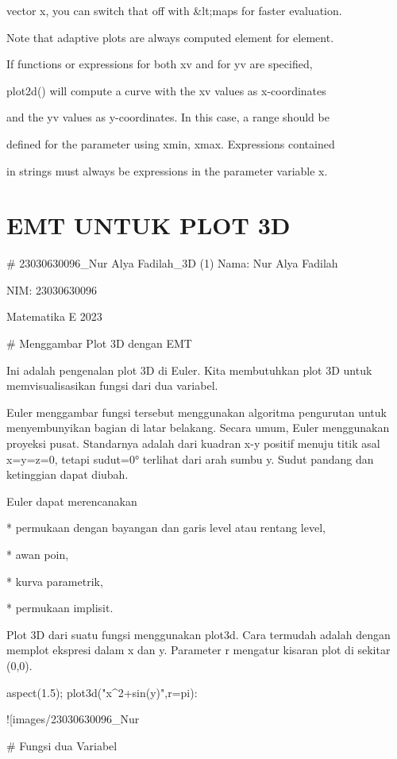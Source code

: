 \documentclass{article}
\begin{document}
vector x, you can switch that off with &lt;maps for faster evaluation.


Note that adaptive plots are always computed element for element. 


If functions or expressions for both xv and for yv are specified,


plot2d() will compute a curve with the xv values as x-coordinates


and the yv values as y-coordinates. In this case, a range should be


defined for the parameter using xmin, xmax. Expressions contained


in strings must always be expressions in the parameter variable x.

\section{EMT UNTUK PLOT 3D}
# 23030630096_Nur Alya Fadilah_3D (1)
Nama: Nur Alya Fadilah


NIM: 23030630096


Matematika E 2023


# Menggambar Plot 3D dengan EMT

Ini adalah pengenalan plot 3D di Euler. Kita membutuhkan plot 3D untuk
memvisualisasikan fungsi dari dua variabel.


Euler menggambar fungsi tersebut menggunakan algoritma pengurutan
untuk menyembunyikan bagian di latar belakang. Secara umum, Euler
menggunakan proyeksi pusat. Standarnya adalah dari kuadran x-y positif
menuju titik asal x=y=z=0, tetapi sudut=0° terlihat dari arah sumbu y.
Sudut pandang dan ketinggian dapat diubah.


Euler dapat merencanakan


* 
permukaan dengan bayangan dan garis level atau rentang level,

* 
awan poin,

* 
kurva parametrik,

* 
permukaan implisit.


Plot 3D dari suatu fungsi menggunakan plot3d. Cara termudah adalah
dengan memplot ekspresi dalam x dan y. Parameter r mengatur kisaran
plot di sekitar (0,0).


\>aspect(1.5); plot3d("x^2+sin(y)",r=pi):


![images/23030630096_Nur%

# Fungsi dua Variabel
\end{document}
